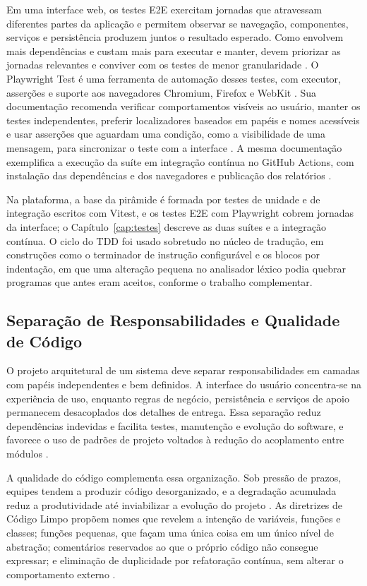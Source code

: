 \label{subsec:fundamentos-e2e}Em uma interface web, os testes E2E exercitam jornadas que atravessam diferentes partes da aplicação e permitem observar se navegação, componentes, serviços e persistência produzem juntos o resultado esperado. Como envolvem mais dependências e custam mais para executar e manter, devem priorizar as jornadas relevantes e conviver com os testes de menor granularidade \cite{vocke2018pyramid}. O Playwright Test é uma ferramenta de automação desses testes, com executor, asserções e suporte aos navegadores Chromium, Firefox e WebKit \cite{playwright2026intro}. Sua documentação recomenda verificar comportamentos visíveis ao usuário, manter os testes independentes, preferir localizadores baseados em papéis e nomes acessíveis e usar asserções que aguardam uma condição, como a visibilidade de uma mensagem, para sincronizar o teste com a interface \cite{playwright2026practices}. A mesma documentação exemplifica a execução da suíte em integração contínua no GitHub Actions, com instalação das dependências e dos navegadores e publicação dos relatórios \cite{playwright2026ci}.

Na plataforma, a base da pirâmide é formada por testes de unidade e de integração escritos com Vitest, e os testes E2E com Playwright cobrem jornadas da interface; o Capítulo~\ref{cap:testes} descreve as duas suítes e a integração contínua. O ciclo do TDD foi usado sobretudo no núcleo de tradução, em construções como o terminador de instrução configurável e os blocos por indentação, em que uma alteração pequena no analisador léxico podia quebrar programas que antes eram aceitos, conforme o trabalho complementar.

\subsection{Separação de Responsabilidades e Qualidade de Código}

O projeto arquitetural de um sistema deve separar responsabilidades em camadas com papéis independentes e bem definidos. A interface do usuário concentra-se na experiência de uso, enquanto regras de negócio, persistência e serviços de apoio permanecem desacoplados dos detalhes de entrega. Essa separação reduz dependências indevidas e facilita testes, manutenção e evolução do software, e favorece o uso de padrões de projeto voltados à redução do acoplamento entre módulos \cite{martin_clean,silveira2012}.

A qualidade do código complementa essa organização. Sob pressão de prazos, equipes tendem a produzir código desorganizado, e a degradação acumulada reduz a produtividade até inviabilizar a evolução do projeto \cite{martin_clean_code,agile2012}. As diretrizes de Código Limpo propõem nomes que revelem a intenção de variáveis, funções e classes; funções pequenas, que façam uma única coisa em um único nível de abstração; comentários reservados ao que o próprio código não consegue expressar; e eliminação de duplicidade por refatoração contínua, sem alterar o comportamento externo \cite{martin_clean_code}.

